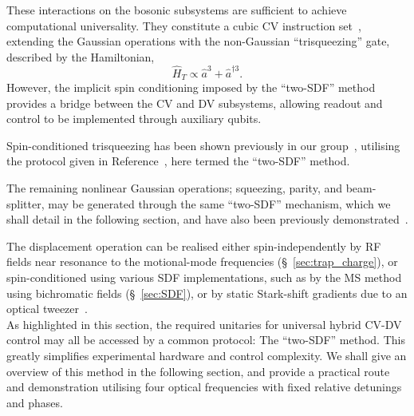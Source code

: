     These interactions on the bosonic subsystems are sufficient to achieve computational universality. They constitute a cubic CV instruction set~\cite{lloyd_quantum_1999, eriksson_universal_2024, hillmann_universal_2020}, extending the Gaussian operations with the non-Gaussian ``trisqueezing'' gate, described by the Hamiltonian,
    \begin{equation}
        \hat H_T \propto \hat a^3 + \hat a^{\dagger 3}.
    \end{equation}
    However, the implicit spin conditioning imposed by the ``two-SDF'' method provides a bridge between the CV and DV subsystems, allowing readout and control to be implemented through auxiliary qubits.

    Spin-conditioned trisqueezing has been shown previously in our group~\cite{bazavan_squeezing_2026}, utilising the protocol given in Reference~\cite{sutherland_universal_2021}, here termed the ``two-SDF'' method.

    The remaining nonlinear Gaussian operations; squeezing, parity, and beam-splitter, may be generated through the same ``two-SDF'' mechanism, which we shall detail in the following section, and have also been previously demonstrated~\cite{bazavan_squeezing_2026,saner_aharonovbohm_2026,bazavan_easy_2024,saner_quantum_2026}.

    The displacement operation can be realised either spin-independently by RF fields near resonance to the motional-mode frequencies (\S~\ref{sec:trap_charge}), or spin-conditioned using various SDF implementations, such as by the MS method using bichromatic fields (\S~\ref{sec:SDF}), or by static Stark-shift gradients due to an optical tweezer~\cite{leindecker_state-dependent_2026}.\\

    As highlighted in this section, the required unitaries for universal hybrid CV-DV control may all be accessed by a common protocol: The ``two-SDF'' method. This greatly simplifies experimental hardware and control complexity. 
    We shall give an overview of this method in the following section, and provide a practical route and demonstration utilising four optical frequencies with fixed relative detunings and phases.

